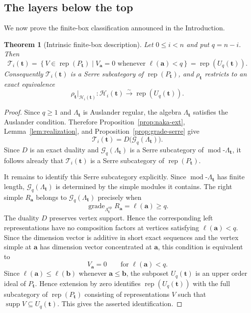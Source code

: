 \documentclass[10pt,a4paper]{amsart}
\newtheorem{theorem}{Theorem}[section]
\newcommand{\Rep}{\operatorname{rep}}
\newcommand{\grade}{\operatorname{grade}}
\newcommand{\modcat}{\operatorname{mod}}
\begin{document}
\subsection{The layers below the top}

We now prove the finite-box classification announced in the Introduction.

\begin{theorem}[Intrinsic finite-box description]\label{thm:finite-intrinsic}
Let $0\le i<n$ and put $q=n-i$.  Then
\[
\boxed{
\mathcal T_i(\mathbf t)
=
\left\{
V\in\Rep(P_{\mathbf t})\mid
V_{\mathbf a}=0\text{ whenever }\ell(\mathbf a)<q
\right\}
=
\Rep(U_q(\mathbf t)).
}
\]
Consequently $\mathcal T_i(\mathbf t)$ is a Serre subcategory of $\Rep(P_{\mathbf t})$, and
$\rho_{\mathbf t}$ restricts to an exact equivalence
\[
\rho_{\mathbf t}|_{\mathcal H_i(\mathbf t)}:
\mathcal H_i(\mathbf t)\xrightarrow{\sim}\Rep(U_q(\mathbf t)).
\]
\end{theorem}

\begin{proof}
Since $q\ge1$ and $\Lambda_{\mathbf t}$ is Auslander regular, the algebra $\Lambda_{\mathbf t}$ satisfies the Auslander condition.  Therefore Proposition~\ref{prop:naka-ext}, Lemma~\ref{lem:realization}, and Proposition~\ref{prop:grade-serre} give
\[
\mathcal T_i(\mathbf t)
=
D\bigl(\mathcal G_q(\Lambda_{\mathbf t})\bigr).
\]
Since $D$ is an exact duality and $\mathcal G_q(\Lambda_{\mathbf t})$ is a Serre subcategory of $\modcat\text{-}\Lambda_{\mathbf t}$, it follows already that $\mathcal T_i(\mathbf t)$ is a Serre subcategory of $\Rep(P_{\mathbf t})$.

It remains to identify this Serre subcategory explicitly.  Since $\modcat\text{-}\Lambda_{\mathbf t}$ has finite length, $\mathcal G_q(\Lambda_{\mathbf t})$ is determined by the simple modules it contains.  The right simple $R_{\mathbf a}$ belongs to $\mathcal G_q(\Lambda_{\mathbf t})$ precisely when
\[
\grade_{\Lambda_{\mathbf t}^{\mathrm{op}}}R_{\mathbf a}=\ell(\mathbf a)\ge q.
\]
The duality $D$ preserves vertex support.  Hence the corresponding left representations have no composition factors at vertices satisfying $\ell(\mathbf a)<q$.  Since the dimension vector is additive in short exact sequences and the vertex simple at $\mathbf a$ has dimension vector concentrated at $\mathbf a$, this condition is equivalent to
\[
V_{\mathbf a}=0\qquad\text{for }\ell(\mathbf a)<q.
\]
Since $\ell(\mathbf a)\le\ell(\mathbf b)$ whenever
$\mathbf a\le\mathbf b$, the subposet $U_q(\mathbf t)$ is an upper order
ideal of $P_{\mathbf t}$.  Hence extension by zero identifies
$\Rep(U_q(\mathbf t))$ with the full subcategory of
$\Rep(P_{\mathbf t})$ consisting of representations $V$ such that
$\operatorname{supp}V\subseteq U_q(\mathbf t)$.  This gives the asserted
identification.
\end{proof}
\end{document}
